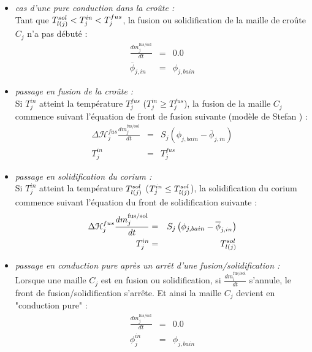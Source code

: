 \begin{itemize}
\item {\it cas d'une pure conduction dans la croûte :}\\
Tant que $\temperature[sol]{l(j)}<T_j^{in}<T_j^{fus}$, la fusion ou solidification de la maille de croûte $C_j$ n'a pas débuté :
\begin{eqnarray*}
\frac{dm_j^\text{fus/sol}}{dt} &=& 0.0 \\
\overline{\phi}_{j,in} &=& \phi_{j,bain}
\end{eqnarray*}

\item {\it passage en fusion de la croûte :}\\
Si $T_j^{in}$ atteint la température $T_j^{fus}$ ($T_j^{in}\ge T_j^{fus}$), la fusion de la maille $C_j$ commence suivant l'équation de front de fusion suivante (modèle de Stefan \cite{LeTellier2016}) :
\begin{eqnarray*}
\Delta \mathcal{H}_j^{fus} \frac{dm_j^\text{fus/sol}}{dt} &=& S_j\left(\phi_{j,bain} - \overline{\phi}_{j,in}\right) \\
T_j^{in} &=& T_j^{fus}
\end{eqnarray*}

\item {\it passage en solidification du corium :}\\
Si $T_j^{in}$ atteint la température $\temperature[sol]{l(j)}$ ($T_j^{in}\le \temperature[sol]{l(j)}$), la solidification du corium commence suivant l'équation du front de solidification suivante :
\begin{eqnarray*}
\Delta \mathcal{H}_j^{fus} \frac{dm_j^\text{fus/sol}}{dt} &=& S_j\left(\phi_{j,bain} - \overline{\phi}_{j,in}\right) \\
T_j^{in} &=& \temperature[sol]{l(j)}
\end{eqnarray*}

\item {\it passage en conduction pure après un arrêt d'une fusion/solidification :}\\
Lorsque une maille $C_j$ est en fusion ou solidification, si $\frac{dm_i^\text{fus/sol}}{dt}$ s'annule, le front de fusion/solidification s'arrête. Et ainsi la maille $C_j$ devient en "conduction pure" :
\begin{eqnarray*}
\frac{dm_j^\text{fus/sol}}{dt} &=& 0.0 \\
\phi_j^{in} &=& \phi_{j,bain}
\end{eqnarray*}
\end{itemize}

